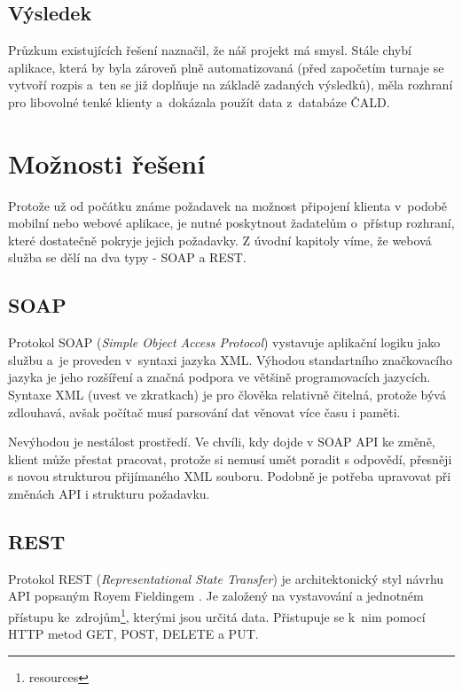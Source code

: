 \subsection{Výsledek}

Průzkum existujících řešení naznačil, že náš projekt má smysl. Stále chybí aplikace,
která by byla zároveň plně automatizovaná (před započetím turnaje se vytvoří rozpis a~ten se
již doplňuje na základě zadaných výsledků), měla rozhraní pro libovolné tenké klienty
a~dokázala použít data z~databáze ČALD.

\section{Možnosti řešení}

Protože už od počátku známe požadavek na možnost připojení klienta v~podobě mobilní nebo webové aplikace,
je nutné poskytnout žadatelům o~přístup rozhraní, které dostatečně pokryje jejich požadavky.
Z úvodní kapitoly víme, že webová služba se dělí na dva typy - SOAP a REST.

\subsection{SOAP}

Protokol SOAP (\textit{Simple Object Access Protocol}) vystavuje aplikační logiku jako službu
a~je proveden v~syntaxi jazyka XML. Výhodou standartního značkovacího jazyka je jeho rozšíření
a značná podpora ve většině programovacích jazycích. Syntaxe XML (uvest ve zkratkach) je pro člověka relativně čitelná,
protože bývá zdlouhavá, avšak počítač musí parsování dat věnovat více času i paměti.

Nevýhodou je nestálost prostředí. Ve chvíli, kdy dojde v SOAP API ke změně, klient může přestat pracovat,
protože si nemusí umět poradit s odpovědí, přesněji s novou strukturou přijímaného XML souboru.
Podobně je potřeba upravovat při změnách API i strukturu požadavku.

 
\subsection{REST}

Protokol REST (\textit{Representational State Transfer}) je architektonický styl návrhu API popsaným Royem Fieldingem \cite{fielding}.
Je založený na vystavování a jednotném přístupu ke~zdrojům\footnote{resources}, kterými jsou určitá data.
Přistupuje se k~nim pomocí HTTP metod GET, POST, DELETE a PUT.

